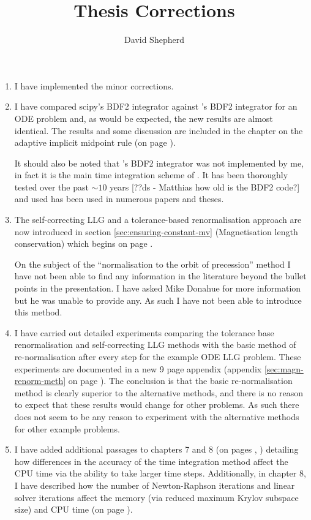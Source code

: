 \documentclass[12pt,a4paper,pdftex]{article}
\title{Thesis Corrections}
\author{David Shepherd}
\begin{document}
\maketitle


\begin{enumerate}
\item I have implemented the minor corrections.

\item I have compared scipy's \vode BDF2 integrator against \oomph's BDF2 integrator for an ODE problem and, as would be expected, the new results are almost identical. The results and some discussion are included in the chapter on the adaptive implicit midpoint rule (on page \pageref{fig:vode-osc-example}).

It should also be noted that \oomph's BDF2 integrator was not implemented by me, in fact it is the main time integration scheme of \oomph.
It has been thoroughly tested over the past $\sim 10$ years [??ds - Matthias how old is the BDF2 code?] and used has been used in numerous papers and theses.

\item The self-correcting LLG and a tolerance-based renormalisation approach are now introduced in section \ref{sec:ensuring-constant-mv} (Magnetisation length conservation) which begins on page \pageref{alt-ml-renorm-intro}.

  On the subject of the ``normalisation to the orbit of precession'' method I have not been able to find any information in the literature beyond the bullet points in the presentation.
I have asked Mike Donahue for more information but he was unable to provide any.
As such I have not been able to introduce this method.

\item I have carried out detailed experiments comparing the tolerance base renormalisation and self-correcting LLG methods with the basic method of re-normalisation after every step for the example ODE LLG problem.
  These experiments are documented in a new 9 page appendix (appendix \ref{sec:magn-renorm-meth} on page \pageref{sec:magn-renorm-meth}).
The conclusion is that the basic re-normalisation method is clearly superior to the alternative methods, and there is no reason to expect that these results would change for other problems.
As such there does not seem to be any reason to experiment with the alternative methods for other example problems.

\item I have added additional passages to chapters 7 and 8 (on pages \pageref{cpu-correction-1}, \pageref{cpu-correction-2}) detailing how differences in the accuracy of the time integration method affect the CPU time via the ability to take larger time steps.
  Additionally, in chapter 8, I have described how the number of Newton-Raphson iterations and linear solver iterations affect the memory (via reduced maximum Krylov subspace size) and CPU time (on page \pageref{mem-cpu-solver-correction}).


\end{enumerate}
\end{document}
